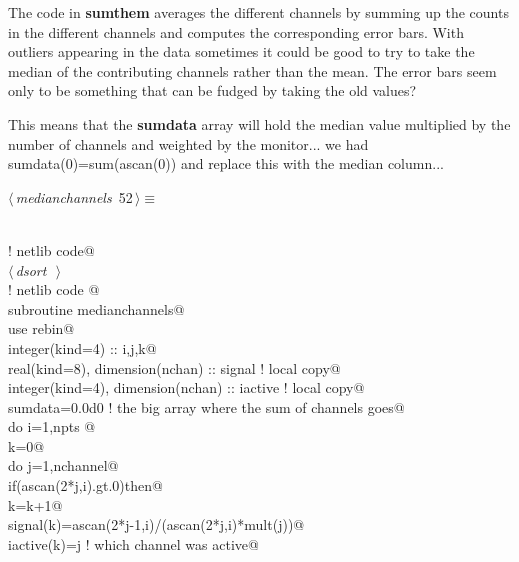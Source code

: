 \documentclass[10pt,a4paper,notitlepage]{article}
\newcommand{\var}[1]{\textbf{\textsf{#1}}} %
\newcommand{\code}[1]{\textbf{\textsf{#1}}} %
\begin{document}
The code in \code{sumthem} averages the different channels by 
summing up the counts in the different channels and computes the 
corresponding error bars.
With outliers appearing in the data sometimes it could be good
to try to take the median of the contributing channels rather
than the mean. 
The error bars seem only to be something that can be fudged by
taking the old values?

This means that the \var{sumdata} array will hold the median
value multiplied by the number of channels and weighted by the
monitor... we had sumdata(0)=sum(ascan(0)) and replace
this with the median column...

\begin{flushleft} \small
\begin{minipage}{\linewidth}\label{scrap55}\raggedright\small
{} $\langle\,${\it medianchannels}\nobreak\ {\footnotesize {52}}$\,\rangle\equiv$
\vspace{-1ex}
\begin{list}{}{} \item
\mbox{}\verb@@\\
\mbox{}\verb@      ! netlib code@\\
\mbox{}\verb@@\hbox{$\langle\,${\it dsort}\nobreak\ {\footnotesize {}}$\,\rangle$}\verb@@\\
\mbox{}\verb@      ! netlib code @\\
\mbox{}\verb@      subroutine medianchannels@\\
\mbox{}\verb@      use rebin@\\
\mbox{}\verb@      integer(kind=4) :: i,j,k@\\
\mbox{}\verb@      real(kind=8), dimension(nchan) :: signal ! local copy@\\
\mbox{}\verb@      integer(kind=4), dimension(nchan) :: iactive ! local copy@\\
\mbox{}\verb@      sumdata=0.0d0 ! the big array where the sum of channels goes@\\
\mbox{}\verb@      do i=1,npts @\\
\mbox{}\verb@        k=0@\\
\mbox{}\verb@        do j=1,nchannel@\\
\mbox{}\verb@          if(ascan(2*j,i).gt.0)then@\\
\mbox{}\verb@            k=k+1@\\
\mbox{}\verb@            signal(k)=ascan(2*j-1,i)/(ascan(2*j,i)*mult(j))@\\
\mbox{}\verb@            iactive(k)=j ! which channel was active@\\

\end{list}
\end{minipage}
\end{flushleft}
\end{document}
